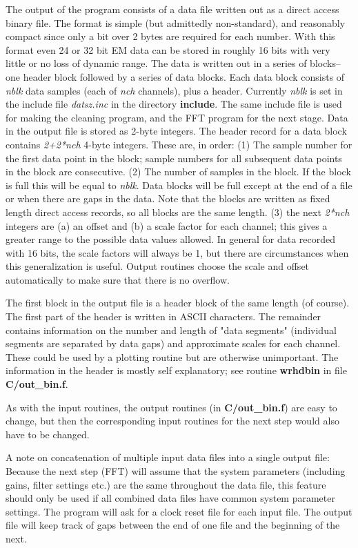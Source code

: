 The output of the program consists of a data file
written out as a direct access binary file.
The format is simple (but admittedly non-standard),
and reasonably compact since only a bit over 2 bytes are
required for each number.  With this format even 24 or 32
bit EM data can be stored in roughly 16 bits with very little
or no loss of dynamic range.
The data is written out in a series of blocks--one
header block followed by a series of data blocks.
Each data block consists of {\it nblk}
data samples (each of {\it nch} channels), plus a header.
Currently {\it nblk} is set in the include file {\it datsz.inc}
in the directory {\bf include}.  The same include file
is used for making the cleaning program, and the FFT program for
the next stage.
Data in the output file is stored as 2-byte integers.
The header record for a data block contains
{\it 2+2*nch} 4-byte integers.
These are, in order:
(1) The sample number for the first data point in the block;
sample numbers for all subsequent data points in the block are
consecutive.  (2) The number of samples in the block.
If the block is full this will be equal to {\it nblk}.
Data blocks will be full except at the end of a file
or when there are gaps in the data.
Note that the blocks are written as fixed length direct
access records, so all blocks are the same length.
(3) the next {\it 2*nch} integers
are (a) an offset and (b) a scale factor
for each channel; this gives a greater range to the possible
data values allowed.
In general for data recorded with 16 bits, the scale factors will
always be 1, but there are circumstances when this generalization
is useful.
Output routines choose the scale and offset automatically to make
sure that there is no overflow.

The first block in the output file is a header
block of the same length (of course).
The first part of
the header is written in ASCII characters.
The remainder contains information on the number and length of
"data segments" (individual segments are separated by data
gaps) and approximate
scales for each channel.  These could be used by a plotting
routine but are otherwise unimportant.
The information in the header is mostly self
explanatory; see routine {\bf wrhdbin} in file {\bf C/out\_bin.f}.

As with the input routines, the output routines 
(in {\bf C/out\_bin.f}) are easy to change, but then
the corresponding input routines for the next step would
also have to be changed.

A note on concatenation of multiple input
data files into a single output file:  Because the next step
(FFT) will assume that the system parameters (including
gains, filter settings etc.) are the same throughout
the data file, this feature should only be used if
all combined data files have common system parameter settings.
The program will ask for a clock reset file for each input
file.  The output file will keep track of gaps between
the end of one file and the beginning of the next.


